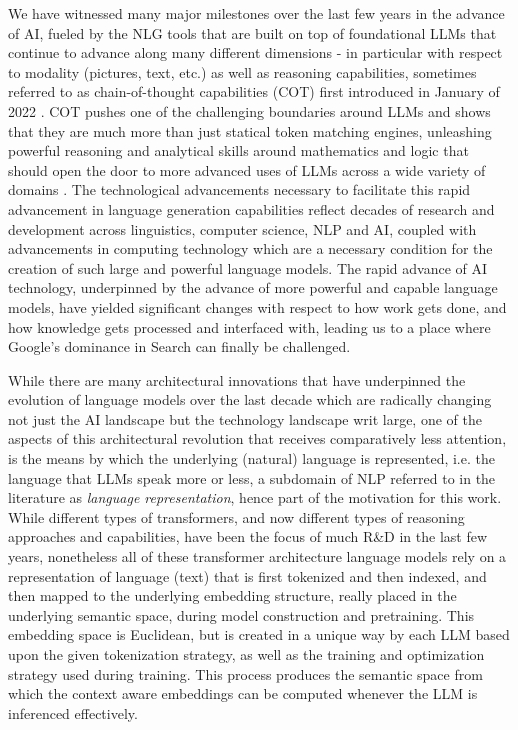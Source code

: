 \documentclass[final]{clv2025}
\begin{document}
We have witnessed many major milestones over the last few years in the advance of AI, fueled by the NLG tools that are built on top of foundational LLMs that continue to advance along many different dimensions - in particular with respect to modality (pictures, text, etc.) as well as reasoning capabilities, sometimes referred to as chain-of-thought capabilities (COT) first introduced in January of 2022 \cite{articlewei}. COT pushes one of the challenging boundaries around LLMs and shows that they are much more than just statical token matching engines, unleashing powerful reasoning and analytical skills around mathematics and logic that should open the door to more advanced uses of LLMs across a wide variety of domains \cite{xu2025towards}. The technological advancements necessary to facilitate this rapid advancement in language generation capabilities reflect decades of research and development across linguistics, computer science, NLP and AI, coupled with advancements in computing technology which are a necessary condition for the creation of such large and powerful language models. The rapid advance of AI technology, underpinned by the advance of more powerful and capable language models, have yielded significant changes with respect to how work gets done, and how knowledge gets processed and interfaced with, leading us to a place where Google's dominance in Search can finally be challenged.

While there are many architectural innovations that have underpinned the evolution of language models over the last decade which are radically changing not just the AI landscape but the technology landscape writ large, one of the aspects of this architectural revolution that receives comparatively less attention, is the means by which the underlying (natural) language is represented, i.e. the language that LLMs speak more or less, a subdomain of NLP referred to in the literature as \textit{language representation}, hence part of the motivation for this work. While different types of transformers, and now different types of reasoning approaches and capabilities, have been the focus of much R\&D in the last few years, nonetheless all of these transformer architecture language models rely on a representation of language (text) that is first tokenized and then indexed, and then mapped to the underlying embedding structure, really placed in the underlying semantic space, during model construction and pretraining. This embedding space is Euclidean, but is created in a unique way by each LLM based upon the given tokenization strategy, as well as the training and optimization strategy used during training. This process produces the semantic space from which the context aware embeddings can be computed whenever the LLM is inferenced effectively. 
\end{document}
